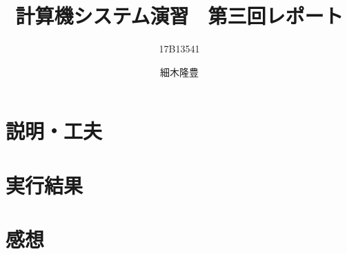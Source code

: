 \documentclass{jarticle}
\title{計算機システム演習　第三回レポート}
\author{17B13541 \and 細木隆豊}
\date{}
\begin{document}
  \maketitle

  \section{説明・工夫}
  \section{実行結果}
  \section{感想}
\end{document}
